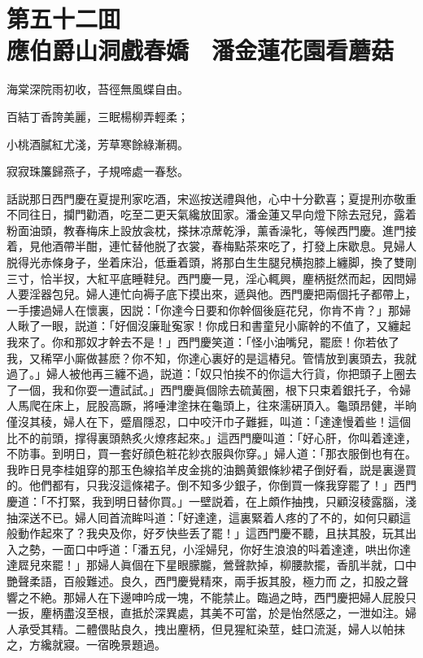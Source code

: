 
\chapter*{第五十二囬　\\應伯爵山洞戲春嬌　潘金蓮花園看蘑菇}


\begin{myquote}
海棠深院雨初收，苔徑無風蝶自由。

百結丁香誇美麗，三眠楊柳弄輕柔；

小桃酒膩紅尤淺，芳草寒餘綠漸稠。

寂寂珠簾歸燕子，子規啼處一春愁。
\end{myquote}

話説那日西門慶在夏提刑家吃酒，宋巡按送禮與他，心中十分歡喜；夏提刑亦敬重不同往日，攔門勸酒，吃至二更天氣纔放囬家。潘金蓮又早向燈下除去冠兒，露着粉面油頭，教春梅床上設放衾枕，搽抹凉蓆乾淨，薰香澡牝，等候西門慶。進門接着，見他酒帶半酣，連忙替他脱了衣裳，春梅點茶來吃了，打發上床歇息。見婦人脱得光赤條身子，坐着床沿，低垂着頭，將那白生生腿兒横抱膝上纏脚，換了雙剛三寸，恰半扠，大紅平底睡鞋兒。西門慶一見，淫心輒興，麈柄挺然而起，因問婦人要淫器包兒。婦人連忙向褥子底下摸出來，遞與他。西門慶把兩個托子都帶上，一手摟過婦人在懷裏，因説：「你達今日要和你幹個後庭花兒，你肯不肯？」那婦人瞅了一眼，説道：「好個沒廉耻寃家！你成日和書童兒小廝幹的不值了，又纏起我來了。你和那奴才幹去不是！」西門慶笑道：「怪小油嘴兒，罷麽！你若依了我，又稀罕小廝做甚麽？你不知，你達心裏好的是這樁兒。管情放到裏頭去，我就過了。」婦人被他再三纏不過，説道：「奴只怕挨不的你這大行貨，你把頭子上圈去了一個，我和你耍一遭試試。」西門慶眞個除去硫黃圈，根下只束着銀托子，令婦人馬爬在床上，屁股高蹶，將唾津塗抹在龜頭上，往來濡硏頂入。龜頭昂健，半晌僅沒其稜，婦人在下，蹙眉隱忍，口中咬汗巾子難捱，叫道：「達達慢着些！這個比不的前頭，撑得裏頭熱炙火燎疼起來。」這西門慶叫道：「好心肝，你叫着達達，不防事。到明日，買一套好顔色粧花紗衣服與你穿。」婦人道：「那衣服倒也有在。我昨日見李桂姐穿的那玉色線掐羊皮金挑的油鵝黄銀條紗裙子倒好看，説是裏邊買的。他們都有，只我沒這條裙子。倒不知多少銀子，你倒買一條我穿罷了！」西門慶道：「不打緊，我到明日替你買。」一壁説着，在上頗作抽拽，只顧沒稜露腦，淺抽深送不已。婦人囘首流眸呌道：「好達達，這裏緊着人疼的了不的，如何只顧這般動作起來了？我央及你，好歹快些丢了罷！」這西門慶不聽，且扶其股，玩其出入之勢，一面口中呼道：「潘五兒，小淫婦兒，你好生浪浪的呌着達達，哄出你達達㞞兒來罷！」那婦人眞個在下星眼朦朧，鶯聲款掉，柳腰款擺，香肌半就，口中艷聲柔語，百般難述。良久，西門慶覺精來，兩手扳其股，極力而𢵞之，扣股之聲響之不絶。那婦人在下邊呻吟成一塊，不能禁止。臨過之時，西門慶把婦人屁股只一扳，麈柄盡沒至根，直抵於深異處，其美不可當，於是怡然感之，一泄如注。婦人承受其精。二體偎貼良久，拽出麈柄，但見猩紅染莖，蛙口流涎，婦人以帕抹之，方纔就寢。一宿晚景題過。

